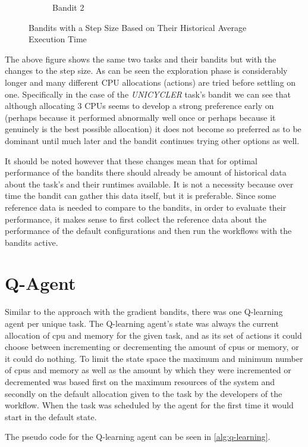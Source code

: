 \begin{figure}[ht]
\begin{subfigure}{.5\textwidth}
  \caption{Bandit 2}
\end{subfigure}
\caption{Bandits with a Step Size Based on Their Historical Average Execution Time}
\label{fig:fixed_bandits}
\end{figure}

The above figure shows the same two tasks and their bandits but with the changes to the step size. As can be seen the exploration phase is considerably longer and many different CPU allocations (actions) are tried before settling on one. Specifically in the case of the \textit{UNICYCLER} task’s bandit we can see that although allocating 3 CPUs seems to develop a strong preference early on (perhaps because it performed abnormally well once or perhaps because it genuinely is the best possible allocation) it does not become so preferred as to be dominant until much later and the bandit continues trying other options as well.

It should be noted however that these changes mean that for optimal performance of the bandits there should already be amount of historical data about the task’s and their runtimes available. It is not a necessity because over time the bandit can gather this data itself, but it is preferable.  Since some reference data is needed to compare to the bandits, in order to evaluate their performance, it makes sense to first collect the reference data about the performance of the default configurations and then run the workflows with the bandits active.

\section{Q-Agent}
\label{sec:q_agent}

Similar to the approach with the gradient bandits, there was one Q-learning agent per unique task. The Q-learning agent’s state was always the current allocation of cpu and memory for the given task, and as its set of actions it could choose between incrementing or decrementing the amount of cpus or memory, or it could do nothing. To limit the state space the maximum and minimum number of cpus and memory as well as the amount by which they were incremented or decremented was based first on the maximum resources of the system and secondly on the default allocation given to the task by the developers of the workflow. When the task was scheduled by the agent for the first time it would start in the default state.

The pseudo code for the Q-learning agent can be seen in \ref{alg:q-learning}.


